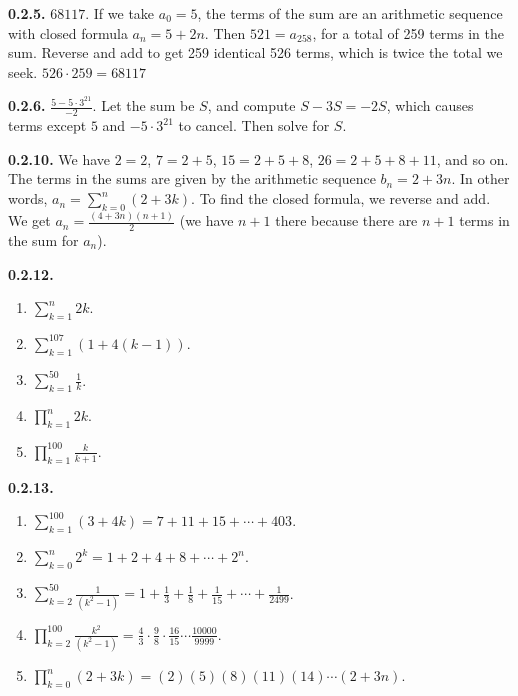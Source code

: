 \documentclass[10pt,]{book}
\theoremstyle{plain}
\theoremstyle{definition}
\theoremstyle{definition}
\theoremstyle{definition}
\theoremstyle{definition}
\numberwithin{equation}{chapter}
\renewcommand{\d}{\displaystyle}
\begin{document}
%
\par\smallskip
\noindent\textbf{0.2.5.} \hypertarget{p-204}{}%
\(68117\).  If we take \(a_0 = 5\), the terms of the sum are an arithmetic sequence with closed formula \(a_n = 5+2n\).  Then \(521 = a_{258}\), for a total of 259 terms in the sum.  Reverse and add to get 259 identical 526 terms, which is twice the total we seek.  \(526\cdot 259 = 68117\)%
\par\smallskip
\noindent\textbf{0.2.6.} \hypertarget{p-206}{}%
\(\frac{5-5\cdot 3^{21}}{-2}\).  Let the sum be \(S\), and compute \(S - 3S = -2S\), which causes terms except \(5\) and \(-5\cdot 3^{21}\) to cancel.  Then solve for \(S\).%
\par\smallskip
\noindent\textbf{0.2.10.} \hypertarget{p-216}{}%
We have \(2 = 2\), \(7 = 2+5\), \(15 = 2 + 5 + 8\), \(26 = 2+5+8+11\), and so on. The terms in the sums are given by the arithmetic sequence \(b_n = 2+3n\). In other words, \(a_n = \sum_{k=0}^n (2+3k)\). To find the closed formula, we reverse and add. We get \(a_n = \frac{(4+3n)(n+1)}{2}\) (we have \(n+1\) there because there are \(n+1\) terms in the sum for \(a_n\)).%
\par\smallskip
\noindent\textbf{0.2.12.} \hypertarget{p-225}{}%
\leavevmode%
\begin{enumerate}[label=(\alph*)]
\item\hypertarget{li-138}{}\(\d\sum_{k=1}^n 2k\).%
\item\hypertarget{li-139}{}\(\d\sum_{k=1}^{107} (1 + 4(k-1))\).%
\item\hypertarget{li-140}{}\(\d\sum_{k=1}^{50} \frac{1}{k}\).%
\item\hypertarget{li-141}{}\(\d\prod_{k=1}^n 2k\).%
\item\hypertarget{li-142}{}\(\d\prod_{k=1}^{100} \frac{k}{k+1}\).%
\end{enumerate}
%
\par\smallskip
\noindent\textbf{0.2.13.} \hypertarget{p-228}{}%
\leavevmode%
\begin{enumerate}[label=(\alph*)]
\item\hypertarget{li-148}{}\(\d\sum_{k=1}^{100} (3+4k) = 7 + 11 + 15 + \cdots + 403\).%
\item\hypertarget{li-149}{}\(\d\sum_{k=0}^n 2^k = 1 + 2 + 4 + 8 + \cdots + 2^n\).%
\item\hypertarget{li-150}{}\(\d\sum_{k=2}^{50}\frac{1}{(k^2 - 1)} = 1 + \frac{1}{3} + \frac{1}{8} + \frac{1}{15} + \cdots + \frac{1}{2499}\).%
\item\hypertarget{li-151}{}\(\d\prod_{k=2}^{100}\frac{k^2}{(k^2-1)} = \frac{4}{3}\cdot\frac{9}{8}\cdot\frac{16}{15}\cdots\frac{10000}{9999}\).%
\item\hypertarget{li-152}{}\(\d\prod_{k=0}^n (2+3k) = (2)(5)(8)(11)(14)\cdots(2+3n)\).%
\end{enumerate}
%
\par\smallskip
\end{document}
